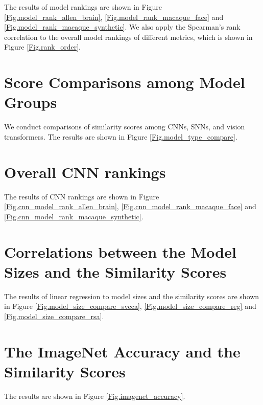 \documentclass[letterpaper]{article} %
\begin{document}
The results of model rankings are shown in Figure \ref{Fig.model_rank_allen_brain}, \ref{Fig.model_rank_macaque_face} and \ref{Fig.model_rank_macaque_synthetic}. We also apply the Spearman's rank correlation to the overall model rankings of different metrics, which is shown in Figure \ref{Fig.rank_order}.

\section{Score Comparisons among Model Groups}
\label{appendix.model_type_compare}

We conduct comparisons of similarity scores among CNNs, SNNs, and vision transformers. The results are shown in Figure \ref{Fig.model_type_compare}.

\section{Overall CNN rankings}
\label{appendix.cnn_rankings}

The results of CNN rankings are shown in Figure \ref{Fig.cnn_model_rank_allen_brain}, \ref{Fig.cnn_model_rank_macaque_face} and \ref{Fig.cnn_model_rank_macaque_synthetic}.

\section{Correlations between the Model Sizes and the Similarity Scores}
\label{appendix.model_size_correlation}

The results of linear regression to model sizes and the similarity scores are shown in Figure \ref{Fig.model_size_compare_svcca}, \ref{Fig.model_size_compare_reg} and \ref{Fig.model_size_compare_rsa}.

\section{The ImageNet Accuracy and the Similarity Scores}
\label{appendix.ImageNet accuracy}

The results are shown in Figure \ref{Fig.imagenet_accuracy}.
\end{document}
